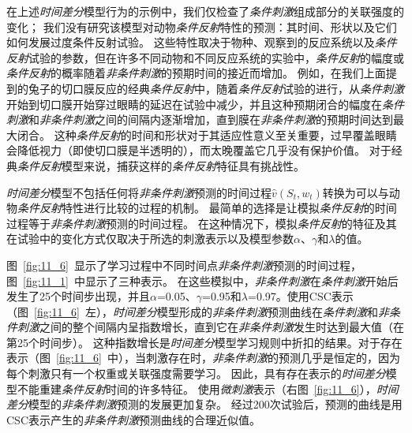 在上述\textit{时间差分}模型行为的示例中，我们仅检查了\textit{条件刺激}组成部分的关联强度的变化；
我们没有研究该模型对动物\textit{条件反射}特性的预测：其时间、形状以及它们如何发展过度条件反射试验。
这些特性取决于物种、观察到的反应系统以及\textit{条件反射}试验的参数，但在许多不同动物和不同反应系统的实验中，\textit{条件反射}的幅度或\textit{条件反射}的概率随着\textit{非条件刺激}的预期时间的接近而增加。
例如，在我们上面提到的兔子的切口膜反应的经典\textit{条件反射}中，随着\textit{条件反射}试验的进行，从\textit{条件刺激}开始到切口膜开始穿过眼睛的延迟在试验中减少，并且这种预期闭合的幅度在\textit{条件刺激}和\textit{非条件刺激}之间的间隔内逐渐增加，直到膜在\textit{非条件刺激}的预期时间达到最大闭合。
这种\textit{条件反射}的时间和形状对于其适应性意义至关重要，过早覆盖眼睛会降低视力（即使切口膜是半透明的），而太晚覆盖它几乎没有保护价值。
对于经典\textit{条件反射}模型来说，捕获这样的\textit{条件反射}特征具有挑战性。


\textit{时间差分}模型不包括任何将\textit{非条件刺激}预测的时间过程$\hat v(S_t,w_t)$转换为可以与动物\textit{条件反射}特性进行比较的过程的机制。
最简单的选择是让模拟\textit{条件反射}的时间过程等于\textit{非条件刺激}预测的时间过程。
在这种情况下，模拟\textit{条件反射}的特征及其在试验中的变化方式仅取决于所选的刺激表示以及模型参数$\alpha$、$\gamma$和$\lambda$的值。


图~\ref{fig:11_6}~显示了学习过程中不同时间点\textit{非条件刺激}预测的时间过程，图~\ref{fig:11_1}~中显示了三种表示。
在这些模拟中，\textit{非条件刺激}在\textit{条件刺激}开始后发生了25个时间步出现，并且$\alpha$=0.05、$\gamma$=0.95和$\lambda$=0.97。使用CSC表示（图~\ref{fig:11_6}~左），\textit{时间差分}模型形成的\textit{非条件刺激}预测曲线在\textit{条件刺激}和\textit{非条件刺激}之间的整个间隔内呈指数增长，直到它在\textit{非条件刺激}发生时达到最大值（在第25个时间步）。
这种指数增长是\textit{时间差分}模型学习规则中折扣的结果。对于存在表示（图~\ref{fig:11_6}~中），当刺激存在时，\textit{非条件刺激}的预测几乎是恒定的，因为每个刺激只有一个权重或关联强度需要学习。
因此，具有存在表示的\textit{时间差分}模型不能重建\textit{条件反射}时间的许多特征。
使用\textit{微刺激}表示（右图~\ref{fig:11_6}），\textit{时间差分}模型的\textit{非条件刺激}预测的发展更加复杂。
经过200次试验后，预测的曲线是用CSC表示产生的\textit{非条件刺激}预测曲线的合理近似值。


